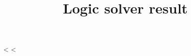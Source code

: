 \documentclass{article}
\title{Logic solver result}
\begin{document}
\maketitle

<%
<%
\end{document}
